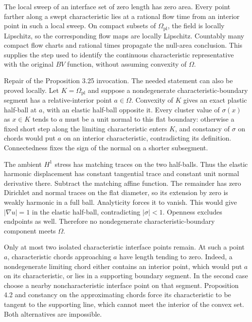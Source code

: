 \documentclass[10pt]{article}
\begin{document}
The local sweep of an interface set of zero length has zero area. Every point farther along a swept characteristic lies at a rational flow time from an interior point in such a local sweep. On compact subsets of \(\Omega_{\mathrm{pl}}\), the field is locally Lipschitz, so the corresponding flow maps are locally Lipschitz. Countably many compact flow charts and rational times propagate the null-area conclusion. This supplies the step used to identify the continuous characteristic representative with the original \(BV\) function, without assuming convexity of \(\Omega\).\par
Repair of the Proposition 3.25 invocation. The needed statement can also be proved locally. Let \(K=\Omega_{\mathrm{pl}}\) and suppose a nondegenerate characteristic-boundary segment has a relative-interior point \(a\in\Omega\). Convexity of \(K\) gives an exact plastic half-ball at \(a\), with an elastic half-ball opposite it. Every cluster value of \(\sigma(x)\) as \(x\in K\) tends to \(a\) must be a unit normal to this flat boundary: otherwise a fixed short step along the limiting characteristic enters \(K\), and constancy of \(\sigma\) on chords would put \(a\) on an interior characteristic, contradicting its definition. Connectedness fixes the sign of the normal on a shorter subsegment.\par
The ambient \(H^1\) stress has matching traces on the two half-balls. Thus the elastic harmonic displacement has constant tangential trace and constant unit normal derivative there. Subtract the matching affine function. The remainder has zero Dirichlet and normal traces on the flat diameter, so its extension by zero is weakly harmonic in a full ball. Analyticity forces it to vanish. This would give \(|\nabla u|=1\) in the elastic half-ball, contradicting \(|\sigma|<1\). Openness excludes endpoints as well. Therefore no nondegenerate characteristic-boundary component meets \(\Omega\).\par
Only at most two isolated characteristic interface points remain. At such a point \(a\), characteristic chords approaching \(a\) have length tending to zero. Indeed, a nondegenerate limiting chord either contains an interior point, which would put \(a\) on its characteristic, or lies in a supporting boundary segment. In the second case choose a nearby noncharacteristic interface point on that segment. Proposition 4.2 and constancy on the approximating chords force its characteristic to be tangent to the supporting line, which cannot meet the interior of the convex set. Both alternatives are impossible.\par
\end{document}
